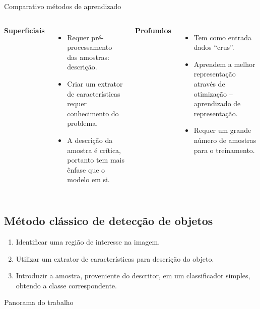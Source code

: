 	\begin{frame}{Comparativo métodos de aprendizado}
	\begin{columns}[T]
		\textbf{Superficiais}
		\begin{itemize}
			\item Requer pré-processamento das amostras: descrição.
			\item Criar um extrator de características requer conhecimento do problema.
			\item A descrição da amostra é crítica, portanto tem mais ênfase que o modelo em si.
		\end{itemize}
		\vfill

		\textbf{Profundos}
		\begin{itemize}
			\item Tem como entrada dados ``crus''.
			\item Aprendem a melhor representação através de otimização -- aprendizado de representação.
			\item Requer um grande número de amostras para o treinamento.
		\end{itemize}
		\vfill
	\end{columns}
	\end{frame}

\subsection{Método clássico de detecção de objetos}
	\begin{frame}{\insertsubsection}
	\begin{enumerate}
	\item Identificar uma região de interesse na imagem.
	\item Utilizar um extrator de características para descrição do objeto.
	\item Introduzir a amostra, proveniente do descritor, em um classificador simples, obtendo a classe correspondente.
	\end{enumerate}

	\end{frame}

	\begin{frame}{Panorama do trabalho}
		\tableofcontents
	\end{frame}
